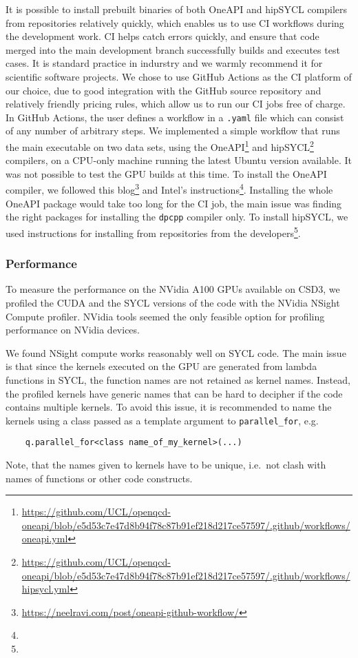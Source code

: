 \documentclass[../main]{subfiles}
\begin{document}
It is possible to install prebuilt binaries of both OneAPI and hipSYCL compilers from repositories relatively quickly, which enables us to use CI workflows during the development work.
CI helps catch errors quickly, and ensure that code merged into the main development branch successfully builds and executes test cases.
It is standard practice in indurstry and we warmly recommend it for scientific software projects.
We chose to use GitHub Actions as the CI platform of our choice, due to good integration with the GitHub source repository and relatively friendly pricing rules, which allow us to run our CI jobs free of charge.
In GitHub Actions, the user defines a workflow in a \verb #.yaml# file which can consist of any number of arbitrary steps.
We implemented a simple workflow that runs the main executable on two data sets, using the OneAPI\footnote{\url{https://github.com/UCL/openqcd-oneapi/blob/e5d53c7e47d8b94f78c87b91ef218d217ce57597/.github/workflows/oneapi.yml}} and hipSYCL\footnote{\url{https://github.com/UCL/openqcd-oneapi/blob/e5d53c7e47d8b94f78c87b91ef218d217ce57597/.github/workflows/hipsycl.yml}} compilers, on a CPU-only machine running the latest Ubuntu version available.
It was not possible to test the GPU builds at this time.
To install the OneAPI compiler, we followed this blog\footnote{\url{https://neelravi.com/post/oneapi-github-workflow/}} and Intel's instructions\footnote{\oneapiaptinstall}.
Installing the whole OneAPI package would take too long for the CI job, the main issue was finding the right packages for installing the \verb #dpcpp# compiler only.
To install hipSYCL, we used instructions for installing from repositories from the developers\footnote{\hipsyclinstallfromrepos}.

\subsubsection{Performance}\label{sec:openqcd_performance}

To measure the performance on the NVidia A100 GPUs available on CSD3, we profiled the CUDA and the SYCL versions of the code with the NVidia NSight Compute profiler.
NVidia tools seemed the only feasible option for profiling performance on NVidia devices.

We found NSight compute works reasonably well on SYCL code.
The main issue is that since the kernels executed on the GPU are generated from lambda functions in SYCL, the function names are not retained as kernel names.
Instead, the profiled kernels have generic names that can be hard to decipher if the code contains multiple kernels.
To avoid this issue, it is recommended to name the kernels using a class passed as a template argument to \verb #parallel_for#, e.g.
\begin{verbatim}
    q.parallel_for<class name_of_my_kernel>(...)
\end{verbatim}
Note, that the names given to kernels have to be unique, i.e.\ not clash with names of functions or other code constructs.
\end{document}
